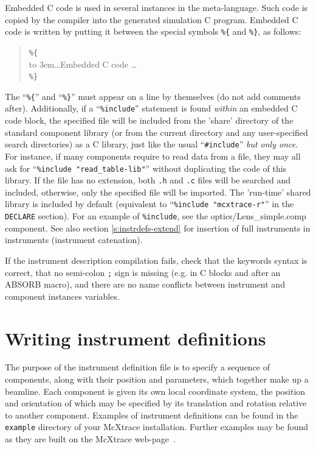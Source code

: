 Embedded C code is used in several instances in the \MCX
meta-language. Such code is copied by the \MCX compiler into the
generated simulation C program. Embedded C code is written by putting it
between the special symbols \verb|%{| and \verb|%}|, as follows:
\begin{quote}
  \verb|%{| \\
  \hbox to 3em{}\ldots Embedded C code \ldots \\
  \verb|%}|
\end{quote} 
The ``\verb|%{|'' and ``\verb|%}|'' must appear on a line by themselves (do not add comments after).
Additionally, if a ``\verb+%include+'' statement is found \emph{within} an embedded C code block, the specified file will be included from the 'share' directory of the standard component library  (or from the
current directory and any user-specified search directories) as a C library, just like the usual ``\verb+#include+'' \emph{but only once}. For instance, if many components require
to read data from a file, they may all ask for ``\verb+%include "read_table-lib"+''  without duplicating the code of this library. If
the file has no extension, both \verb+.h+ and \verb+.c+ files will be searched and included, otherwise, only the specified file will be imported. The \MCX 'run-time' shared
library is included by default (equivalent to ``\verb+%include "mcxtrace-r"+'' in the \texttt{DECLARE} section). 
For an example of \texttt{\%include}, see the optics/Lens\_simple.comp component. See also section \ref{s:instrdefs-extend} for insertion of full instruments in instruments
  (instrument catenation).

If the instrument description compilation fails, check that the
keywords syntax is correct, that no semi-colon \verb+;+ sign is
missing (e.g. in C blocks and after an ABSORB macro), and there are no name conflicts between instrument and component instances variables.


\section{Writing instrument definitions}
\label{s:instrdefs}

The purpose of the instrument definition file is to specify a sequence of
components, along with their position and parameters, which together
make up a beamline. Each component is given its own local coordinate
system, the position and orientation of which may be specified by its
translation and rotation relative to another component. 
Examples of instrument definitions can be found in the \texttt{example} directory of your 
McXtrace installation. Further examples may be found as they are built on the McXtrace web-page~\cite{mcxtrace_webpage}.

